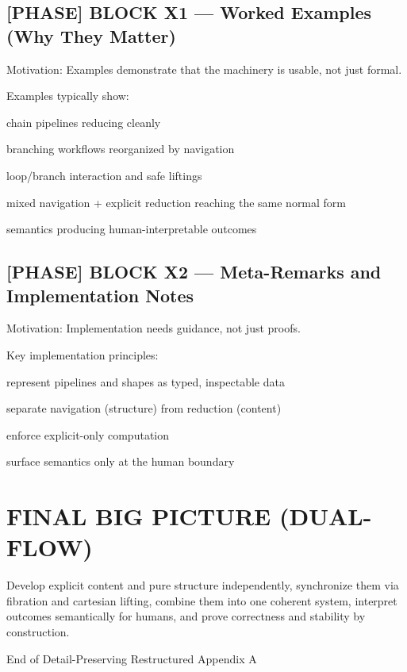\subsection*{[PHASE] BLOCK X1 --- Worked Examples (Why They Matter)}

Motivation: Examples demonstrate that the machinery is usable, not just formal.\par

Examples typically show:\par

chain pipelines reducing cleanly\par

branching workflows reorganized by navigation\par

loop/branch interaction and safe liftings\par

mixed navigation + explicit reduction reaching the same normal form\par

semantics producing human-interpretable outcomes\par

\subsection*{[PHASE] BLOCK X2 --- Meta-Remarks and Implementation Notes}

Motivation: Implementation needs guidance, not just proofs.\par

Key implementation principles:\par

represent pipelines and shapes as typed, inspectable data\par

separate navigation (structure) from reduction (content)\par

enforce explicit-only computation\par

surface semantics only at the human boundary\par

\section*{FINAL BIG PICTURE (DUAL-FLOW)}

Develop explicit content and pure structure independently, synchronize them via fibration and cartesian lifting, combine them into one coherent system, interpret outcomes semantically for humans, and prove correctness and stability by construction.\par

End of Detail-Preserving Restructured Appendix A\par

